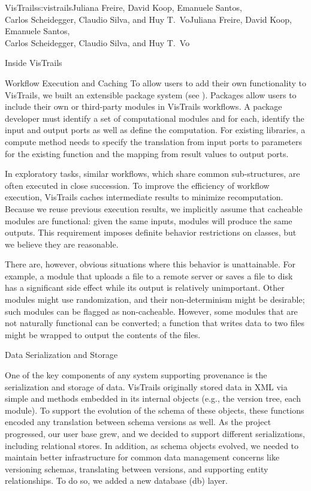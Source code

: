 \begin{aosachaptertoc}{VisTrails}{s:vistrails}{Juliana Freire, David Koop, Emanuele Santos, \\ Carlos Scheidegger, Claudio Silva, and Huy T.\ Vo}{Juliana Freire, David Koop, Emanuele Santos, \\ \hspace*{0.9cm} Carlos Scheidegger, Claudio Silva, and Huy T.\ Vo}
\begin{aosasect1}{Inside VisTrails}
\begin{aosasect2}{Workflow Execution and Caching}
To allow users to add their own functionality to VisTrails, we built
an extensible package system (see
).  Packages allow users to include
their own or third-party modules in VisTrails workflows.  A package
developer must identify a set of computational modules and for each,
identify the input and output ports as well as define the computation.
For existing libraries, a compute method needs to specify the
translation from input ports to parameters for the existing function
and the mapping from result values to output ports.

In exploratory tasks, similar workflows, which share common
sub-structures, are often executed in close succession. To improve the
efficiency of workflow execution, VisTrails caches intermediate
results to minimize recomputation.  Because we reuse previous
execution results, we implicitly assume that cacheable modules are
functional: given the same inputs, modules will produce the same
outputs. This requirement imposes definite behavior restrictions on
classes, but we believe they are reasonable. 

There are, however, obvious situations where this behavior
is unattainable.  For example, a module that uploads a file to a
remote server or saves a file to disk has a significant side effect
while its output is relatively unimportant.  Other modules might use
randomization, and their non-determinism might be desirable; such
modules can be flagged as non-cacheable. However, some modules that
are not naturally functional can be converted; a function that writes
data to two files might be wrapped to output the contents of the
files.

\end{aosasect2}

\begin{aosasect2}{Data Serialization and Storage}

One of the key components of any system supporting provenance is the
serialization and storage of data.  VisTrails originally stored data
in XML via simple  and  methods embedded in
its internal objects (e.g., the version tree, each module).  To
support the evolution of the schema of these objects, these functions
encoded any translation between schema versions as well.  As the
project progressed, our user base grew, and we decided to support
different serializations, including relational stores.  In
addition, as schema objects evolved, we needed to maintain better
infrastructure for common data management concerns like versioning
schemas, translating between versions, and supporting entity
relationships.  To do so, we added a new database (db) layer.


\end{aosasect2}
\end{aosasect1}
\end{aosachaptertoc}
